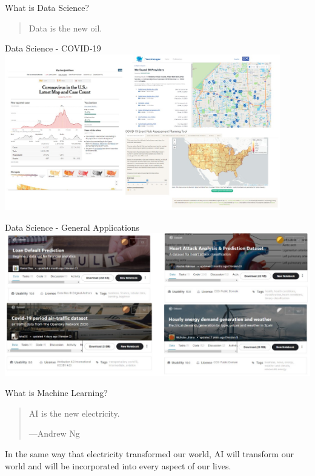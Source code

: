 \documentclass[aspectratio=169]{beamer}
\begin{document}
\begin{frame}{What is Data Science?}
    \begin{quote}
        Data is the new oil.
    \end{quote}
\end{frame}

\begin{frame}{Data Science - COVID-19}
    \centering
    \includegraphics[width=0.9\textwidth]{imgs/vis_4.jpg}
\end{frame}

\begin{frame}{Data Science - General Applications}
    \centering
    \includegraphics[width=\textwidth]{imgs/vis_5.jpg}
\end{frame}

\begin{frame}{What is Machine Learning?}
    \begin{quote}
        AI is the new electricity.
        \begin{flushleft}
            ---Andrew Ng
        \end{flushleft}
    \end{quote}

    \vspace{\baselineskip}

    In the same way that electricity transformed our world, AI will transform our world and will be incorporated into every aspect of our lives.

\end{frame}
\end{document}
